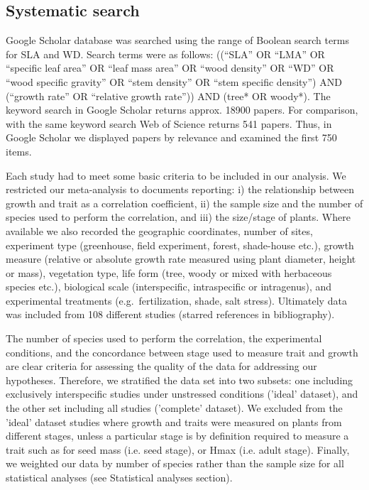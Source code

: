 \documentclass[a4paper]{article}\usepackage[]{graphicx}\usepackage[]{color}
\begin{document}
\subsection*{Systematic search}\label{systematic-search}

Google Scholar database was searched using the range of Boolean search terms for SLA and WD. Search terms were as follows: ((``SLA'' OR ``LMA'' OR ``specific leaf area'' OR ``leaf mass area'' OR ``wood density'' OR ``WD'' OR ``wood specific gravity'' OR ``stem density'' OR ``stem specific density'') AND (``growth rate'' OR ``relative growth rate'')) AND (tree* OR woody*). The keyword search in Google Scholar returns approx. 18900 papers. For comparison, with the same keyword search Web of Science returns 541 papers. Thus, in Google Scholar we displayed papers by relevance and examined the first 750 items.

Each study had to meet some basic criteria to be included in our analysis. We restricted our meta-analysis to documents reporting: i) the relationship between growth and trait as a correlation coefficient, ii) the sample size and the number of species used to perform the correlation, and iii) the size/stage of plants. Where available we also recorded the geographic coordinates, number of sites, experiment type (greenhouse, field experiment, forest, shade-house etc.), growth measure (relative or absolute growth rate measured using plant diameter, height or mass), vegetation type, life form (tree, woody or mixed with herbaceous species etc.), biological scale (interspecific, intraspecific or intragenus), and experimental treatments (e.g.~fertilization, shade, salt stress). Ultimately data was included from 108 different studies (starred references in bibliography).

The number of species used to perform the correlation, the experimental conditions, and the concordance between stage used to measure trait and growth are clear criteria for assessing the quality of the data for addressing our hypotheses. Therefore, we stratified the data set into two subsets: one including exclusively interspecific studies under unstressed conditions ('ideal' dataset), and the other set including all studies ('complete' dataset). We excluded from the 'ideal' dataset studies where growth and traits were measured on plants from different stages, unless a particular stage is by definition required to measure a trait such as for seed mass (i.e. seed stage), or Hmax (i.e. adult stage). Finally, we weighted our data by number of species rather than the sample size for all statistical analyses (see Statistical analyses section).
\end{document}
